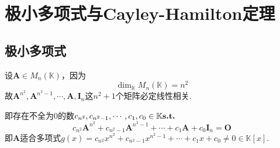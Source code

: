 \newpage
\section{极小多项式与Cayley-Hamilton定理}
\subsection{极小多项式}
设$\bm{A}\in M_n\left(
    \mathbb{K}
    \right)$，因为
\[
    \dim_{\mathbb{K}}M_n\left(
    \mathbb{K}
    \right)=n^2
\]故$\bm{A}^{n^2},\bm{A}^{n^2-1},\cdots,\bm{A},\bm{I}_n$这$n^2+1$个矩阵必定线性相关.

即存在不全为$0$的数$c_{n^2},c_{n^2-1},\cdots,c_1,c_0\in\mathbb{K}\textup{\bfseries{s.t.}}$
\[
    c_{n^2}\bm{A}^{n^2}+c_{n^2-1}\bm{A}^{n^2-1}+\cdots+c_1\bm{A}+c_0\bm{I}_n=\bm{O}
\]即$\bm{A}$适合多项式$g\left(x\right)=
    c_{n^2}x^{n^2}+c_{n^2-1}x^{n^2-1}+\cdots+c_1x+c_0\neq 0\in\mathbb{K}\left[x\right].$

